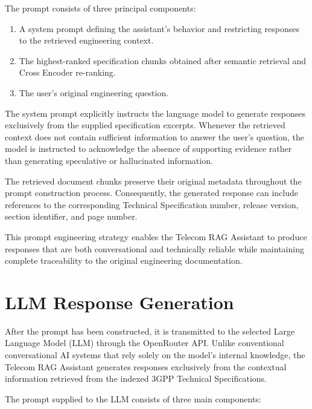 The prompt consists of three principal components:

\begin{enumerate}

\item A system prompt defining the assistant's behavior and restricting responses to the retrieved engineering context.

\item The highest-ranked specification chunks obtained after semantic retrieval and Cross Encoder re-ranking.

\item The user's original engineering question.

\end{enumerate}

The system prompt explicitly instructs the language model to generate responses exclusively from the supplied specification excerpts. Whenever the retrieved context does not contain sufficient information to answer the user's question, the model is instructed to acknowledge the absence of supporting evidence rather than generating speculative or hallucinated information.

The retrieved document chunks preserve their original metadata throughout the prompt construction process. Consequently, the generated response can include references to the corresponding Technical Specification number, release version, section identifier, and page number.

This prompt engineering strategy enables the Telecom RAG Assistant to produce responses that are both conversational and technically reliable while maintaining complete traceability to the original engineering documentation.
\section{LLM Response Generation}

After the prompt has been constructed, it is transmitted to the selected Large Language Model (LLM) through the OpenRouter API. Unlike conventional conversational AI systems that rely solely on the model's internal knowledge, the Telecom RAG Assistant generates responses exclusively from the contextual information retrieved from the indexed 3GPP Technical Specifications.

The prompt supplied to the LLM consists of three main components:

